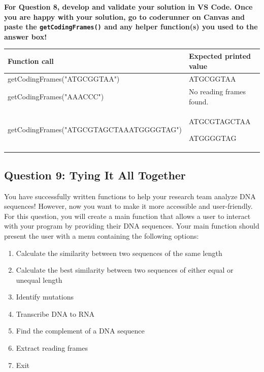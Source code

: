 \textbf{For Question 8, develop and validate your solution in VS Code. Once you are happy with your solution, go to coderunner on Canvas and paste the \texttt{getCodingFrames()} and any helper function(s) you used to the answer box!} 

\begin{sampleProject}
    \hspace{0pt}
    \begin{longtable}{|p{2.6in}|p{2.5in}|}
        \hline
        \textbf{Function call}
            & 
            \textbf{Expected printed value}
            \\ \hline
        
        getCodingFrames("ATGCGGTAA")
            & 
            ATGCGGTAA
            \\ \hline
        
        getCodingFrames("AAACCC")
            & 
            No reading frames found.
            \\ \hline
        
        getCodingFrames("ATGCGTAGCTAAATGGGGTAG")
            & 
            ATGCGTAGCTAA
            
            ATGGGGTAG
            \\ \hline
    \end{longtable}
\end{sampleProject}


\subsection{Question 9: Tying It All Together}

You have successfully written functions to help your research team analyze DNA sequences! However, now you want to make it more accessible and user-friendly. For this question, you will create a main function that allows a user to interact with your program by providing their DNA sequences. Your main function should present the user with a menu containing the following options:

\begin{enumerate}[left=1cm]
    \item Calculate the similarity between two sequences of the same length
    \item Calculate the best similarity between two sequences of either equal or unequal length
    \item Identify mutations
    \item Transcribe DNA to RNA
    \item Find the complement of a DNA sequence
    \item Extract reading frames
    \item Exit
\end{enumerate}

